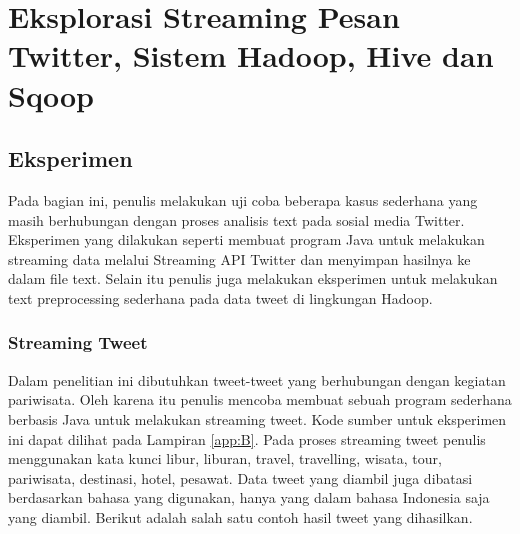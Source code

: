\chapter{Eksplorasi Streaming Pesan Twitter, Sistem Hadoop, Hive dan Sqoop}

\section{Eksperimen}
Pada bagian ini, penulis melakukan uji coba beberapa kasus sederhana yang masih berhubungan dengan proses analisis text pada sosial media Twitter. Eksperimen yang dilakukan seperti membuat program Java untuk melakukan streaming data melalui Streaming API Twitter dan menyimpan hasilnya ke dalam file text. Selain itu penulis juga melakukan eksperimen untuk melakukan text preprocessing sederhana pada data tweet di lingkungan Hadoop.

\subsection{Streaming Tweet}
Dalam penelitian ini dibutuhkan tweet-tweet yang berhubungan dengan kegiatan pariwisata. Oleh karena itu penulis mencoba membuat sebuah program sederhana berbasis Java untuk melakukan streaming tweet. Kode sumber untuk eksperimen ini dapat dilihat pada Lampiran \ref{app:B}. Pada proses streaming tweet penulis menggunakan kata kunci  libur, liburan, travel, travelling, wisata, tour, pariwisata, destinasi, hotel, pesawat. Data tweet yang diambil juga dibatasi berdasarkan bahasa yang digunakan, hanya yang dalam bahasa Indonesia saja yang diambil. Berikut adalah salah satu contoh hasil tweet yang dihasilkan.

